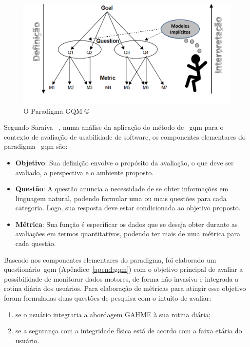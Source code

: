 \begin{figure}[!htbp]
 \centering
 \includegraphics[scale=0.50]{./img/gqm.png}
 \caption[O Paradigma GQM \copyright]{O Paradigma GQM \copyright~\cite{van1999goal}}
 \label{fig:gqm}
\end{figure}

Segundo Saraiva ~\cite{saraiva2006}, numa análise da aplicação do método de ~\ac{gqm} para o contexto de avaliação de usabilidade de software, os componentes elementares do paradigma ~\ac{gqm} são:

\begin{itemize}
	\item \textbf{Objetivo}: Sua definição envolve o propósito da avaliação, o que deve ser avaliado, a perspectiva e o ambiente proposto.
	\item \textbf{Questão}: A questão anuncia a necessidade de se obter informações em linguagem natural, podendo formular uma ou mais questões para cada categoria. Logo, sua resposta deve estar condicionada ao objetivo proposto.
	\item \textbf{Métrica}: Sua função é especificar os dados que se deseja obter durante as avaliações em termos quantitativos, podendo ter mais de uma métrica para cada questão.	
\end{itemize}

Baseado nos componentes elementares do paradigma, foi elaborado um questionário~\ac{gqm} (Apêndice~\ref{apend:gqm}) com o objetivo principal de avaliar a possibilidade de monitorar dados motores, de forma não invasiva e integrada a rotina diária dos usuários. Para elaboração de métricas para atingir esse objetivo foram formuladas duas questões de pesquisa com o intuito de avaliar:
\begin{enumerate}
	\item se o usuário integraria a abordagem GAHME à sua rotina diária;
	\item se a segurança com a integridade física está de acordo com a faixa etária do usuário.
\end{enumerate}

